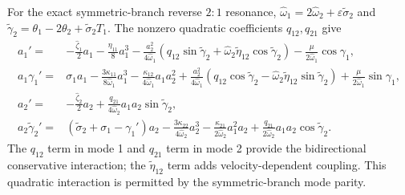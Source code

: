 \documentclass[11pt]{article}
\begin{document}
For the exact symmetric-branch reverse $2{:}1$ resonance, $\hat{\omega}_1=2\hat{\omega}_2+\varepsilon\tilde{\sigma}_2$ and $\tilde{\gamma}_2=\theta_1-2\theta_2+\tilde{\sigma}_2T_1$. The nonzero quadratic coefficients $q_{12},q_{21}$ give
\begin{align}
a_1'={}&-\frac{\hat{\zeta}_1}{2}a_1-\frac{\eta_{11}}{8}a_1^3-\frac{a_2^2}{4\hat{\omega}_1}(q_{12}\sin\tilde{\gamma}_2+\hat{\omega}_2\tilde{\eta}_{12}\cos\tilde{\gamma}_2)-\frac{\mu}{2\hat{\omega}_1}\cos\gamma_1,\nonumber\\
a_1\gamma_1'={}&\sigma_1a_1-\frac{3\kappa_{11}}{8\hat{\omega}_1}a_1^3-\frac{\kappa_{12}}{4\hat{\omega}_1}a_1a_2^2
+\frac{a_2^2}{4\hat{\omega}_1}(q_{12}\cos\tilde{\gamma}_2-\hat{\omega}_2\tilde{\eta}_{12}\sin\tilde{\gamma}_2)+\frac{\mu}{2\hat{\omega}_1}\sin\gamma_1,\nonumber\\
a_2'={}&-\frac{\hat{\zeta}_2}{2}a_2+\frac{q_{21}}{4\hat{\omega}_2}a_1a_2\sin\tilde{\gamma}_2,\nonumber\\
a_2\tilde{\gamma}_2'={}&(\tilde{\sigma}_2+\sigma_1-\gamma_1')a_2-\frac{3\kappa_{22}}{4\hat{\omega}_2}a_2^3-\frac{\kappa_{21}}{2\hat{\omega}_2}a_1^2a_2
+\frac{q_{21}}{2\hat{\omega}_2}a_1a_2\cos\tilde{\gamma}_2.\label{eq:slowflow-21}
\end{align}
The $q_{12}$ term in mode 1 and $q_{21}$ term in mode 2 provide the bidirectional conservative interaction; the $\tilde{\eta}_{12}$ term adds velocity-dependent coupling. This quadratic interaction is permitted by the symmetric-branch mode parity.
\end{document}
